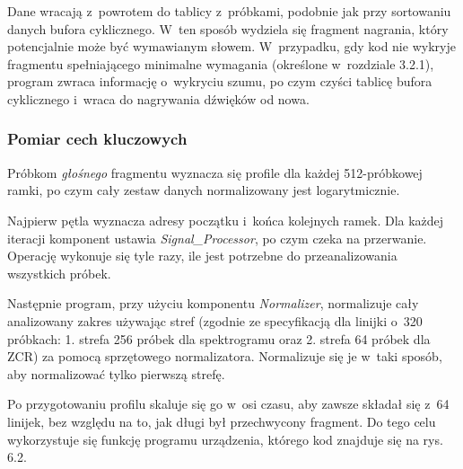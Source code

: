 Dane wracają z~powrotem do tablicy z~próbkami, podobnie jak przy sortowaniu danych bufora cyklicznego. W~ten sposób wydziela się fragment nagrania, który potencjalnie może być wymawianym słowem. W~przypadku, gdy kod nie wykryje fragmentu spełniającego minimalne wymagania (określone w~rozdziale 3.2.1), program zwraca informację o~wykryciu szumu, po czym czyści tablicę bufora cyklicznego i~wraca do nagrywania dźwięków od nowa.

\subsubsection{Pomiar cech kluczowych}
Próbkom \textit{głośnego} fragmentu wyznacza się profile dla każdej 512-próbkowej ramki, po czym cały zestaw danych normalizowany jest logarytmicznie.

Najpierw pętla wyznacza adresy początku i~końca kolejnych ramek. Dla każdej iteracji komponent ustawia \textit{Signal\_Processor}, po czym czeka na przerwanie. Operację wykonuje się tyle razy, ile jest potrzebne do przeanalizowania wszystkich próbek.

Następnie program, przy użyciu komponentu \textit{Normalizer}, normalizuje cały analizowany zakres używając stref (zgodnie ze specyfikacją dla linijki o~320 próbkach: 1. strefa 256 próbek dla spektrogramu oraz 2. strefa 64 próbek dla ZCR) za pomocą sprzętowego normalizatora. Normalizuje się je w~taki sposób, aby normalizować tylko pierwszą strefę.

Po przygotowaniu profilu skaluje się go w~osi czasu, aby zawsze składał się z~64 linijek, bez względu na to, jak długi był przechwycony fragment. Do tego celu wykorzystuje się funkcję programu urządzenia, którego kod znajduje się na rys. 6.2.

